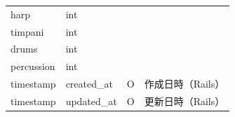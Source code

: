 \begin{table}[p]
\begin{tabularx}{\textwidth}{llcR}
        harp                   & int         &          &              \\
        timpani                & int         &          &              \\
        drums                  & int         &          &              \\
        percussion             & int         &          &              \\
        timestamp              & created\_at & O        & 作成日時（Rails）  \\
        timestamp              & updated\_at & O        & 更新日時（Rails）  \\
        \hline
    \end{tabularx}
    \label{tableDesgin2}
\end{table}
